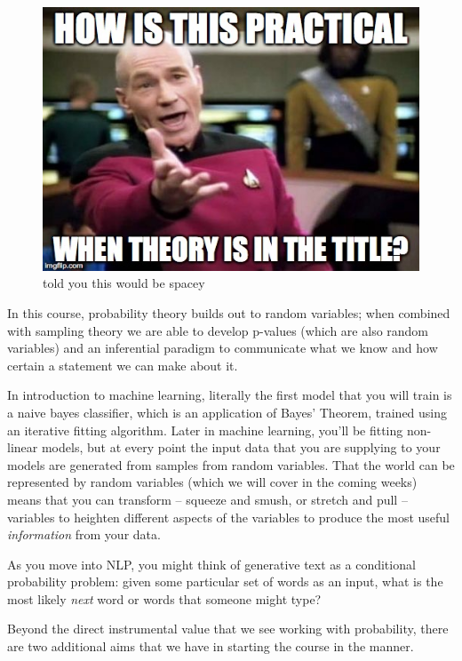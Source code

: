 \documentclass[
]{book}
\theoremstyle{definition}
\theoremstyle{definition}
\theoremstyle{definition}
\theoremstyle{definition}
\theoremstyle{remark}
\begin{document}
\begin{figure}
\centering
\includegraphics{./images/picard.jpg}
\caption{told you this would be spacey}
\end{figure}

In this course, probability theory builds out to random variables; when combined with sampling theory we are able to develop p-values (which are also random variables) and an inferential paradigm to communicate what we know and how certain a statement we can make about it.

In introduction to machine learning, literally the first model that you will train is a naive bayes classifier, which is an application of Bayes' Theorem, trained using an iterative fitting algorithm. Later in machine learning, you'll be fitting non-linear models, but at every point the input data that you are supplying to your models are generated from samples from random variables. That the world can be represented by random variables (which we will cover in the coming weeks) means that you can transform -- squeeze and smush, or stretch and pull -- variables to heighten different aspects of the variables to produce the most useful \emph{information} from your data.

As you move into NLP, you might think of generative text as a conditional probability problem: given some particular set of words as an input, what is the most likely \emph{next} word or words that someone might type?

Beyond the direct instrumental value that we see working with probability, there are two additional aims that we have in starting the course in the manner.
\end{document}
